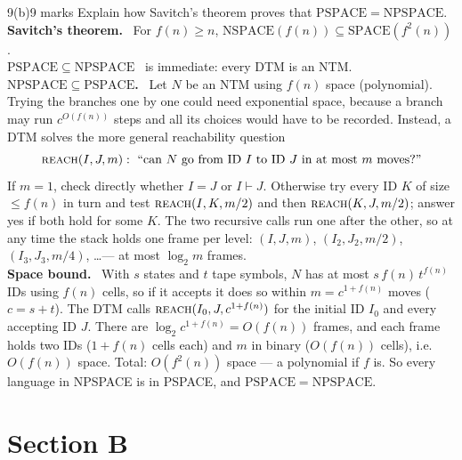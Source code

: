 \documentclass[10.5pt,a4paper]{article}
\newcommand{\ansh}[1]{\textbf{\color{exborder}#1}\ }
\newcommand{\PS}{\mathrm{PSPACE}}
\newcommand{\NPS}{\mathrm{NPSPACE}}
\begin{document}
\begin{qa}{9(b)}{9 marks}
Explain how Savitch's theorem proves that $\PS=\NPS$.
\tcblower
\ansh{Savitch's theorem.} For $f(n)\ge n$, $\mathrm{NSPACE}(f(n))\subseteq\mathrm{SPACE}(f^2(n))$.\\
\ansh{$\PS\subseteq\NPS$} is immediate: every DTM is an NTM.\\
\ansh{$\NPS\subseteq\PS$.} Let $N$ be an NTM using $f(n)$ space (polynomial). Trying the branches one by one could need exponential space, because a
branch may run $c^{O(f(n))}$ steps and all its choices would have to be recorded. Instead, a DTM solves the more general reachability question
\[\textsc{reach}(I,J,m):\ \text{``can $N$ go from ID $I$ to ID $J$ in at most $m$ moves?''}\]
If $m=1$, check directly whether $I=J$ or $I\vdash J$. Otherwise try every ID $K$ of size $\le f(n)$ in turn and test $\textsc{reach}(I,K,m/2)$
and then $\textsc{reach}(K,J,m/2)$; answer yes if both hold for some $K$. The two recursive calls run one after the other, so at any time the stack
holds one frame per level: $(I,J,m)$, $(I_2,J_2,m/2)$, $(I_3,J_3,m/4)$, \dots --- at most $\log_2m$ frames.\\
\ansh{Space bound.} With $s$ states and $t$ tape symbols, $N$ has at most $s\,f(n)\,t^{f(n)}$ IDs using $f(n)$ cells, so if it accepts it does so
within $m=c^{1+f(n)}$ moves ($c=s+t$). The DTM calls $\textsc{reach}(I_0,J,c^{1+f(n)})$ for the initial ID $I_0$ and every accepting ID $J$. There are
$\log_2c^{1+f(n)}=O(f(n))$ frames, and each frame holds two IDs ($1+f(n)$ cells each) and $m$ in binary ($O(f(n))$ cells), i.e.\ $O(f(n))$ space.
Total: $O(f^2(n))$ space --- a polynomial if $f$ is. So every language in NPSPACE is in PSPACE, and $\PS=\NPS$.
\end{qa}

\clearpage
\section*{Section B}
\end{document}
